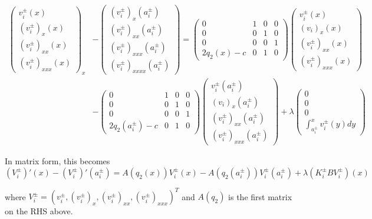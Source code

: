 \documentclass[12pt]{article}
\begin{document}
\begin{align*}
\begin{pmatrix}v_i^\pm(x)\\(v_i^\pm)_x(x)\\(v_i^\pm)_{xx}(x)\\(v_i^\pm)_{xxx}(x)\end{pmatrix}_x &- \begin{pmatrix}(v_i^\pm)_x(a_i^\pm)\\(v_i^\pm)_{xx}(a_i^\pm)\\(v_i^\pm)_{xxx}(a_i^\pm)\\(v_i^\pm)_{xxxx}(a_i^\pm)\end{pmatrix}
= \begin{pmatrix}0 & 1 & 0 & 0 \\ 0 & 0 & 1 & 0 \\ 0 & 0 & 0 & 1 \\ 2q_2(x) - c & 0 & 1 & 0\end{pmatrix}
\begin{pmatrix}v_i^\pm(x) \\(v_i)_x(x) \\(v_i^\pm)_{xx}(x) \\(v_i^\pm)_{xxx}(x) \end{pmatrix}\\
&-\begin{pmatrix}0 & 1 & 0 & 0 \\ 0 & 0 & 1 & 0 \\ 0 & 0 & 0 & 1 \\ 2q_2(a_i^\pm) - c & 0 & 1 & 0\end{pmatrix}
\begin{pmatrix}v_i^\pm(a_i^\pm) \\(v_i)_x(a_i^\pm) \\(v_i^\pm)_{xx}(a_i^\pm) \\(v_i^\pm)_{xxx}(a_i^\pm)\end{pmatrix} + \lambda 
\begin{pmatrix}0\\0\\0\\ \int_{a_i^\pm}^x v_i^\pm(y) dy\end{pmatrix}
\end{align*}

In matrix form, this becomes
\[
(V_i^\pm)'(x) - (V_i^\pm)'(a_i^\pm) = A(q_2(x)) V_i^\pm(x) - A(q_2(a_i^\pm)) V_i^\pm(a_i^\pm) + \lambda (K_i^\pm B V_i^\pm)(x)
\]

where $V_i^\pm = (v_i^\pm, (v_i^\pm)_x, (v_i^\pm)_{xx}, (v_i^\pm)_{xxx})^T$ and $A(q_2)$ is the first matrix on the RHS above.
\end{document}
